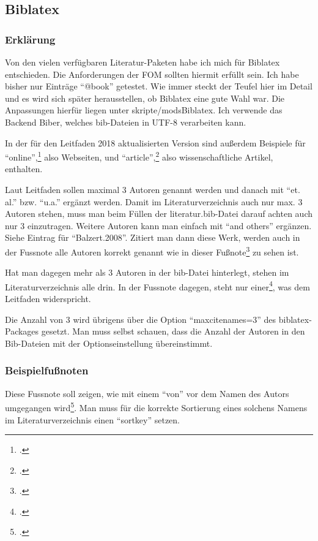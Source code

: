
\subsection{Biblatex}
\subsubsection{Erklärung}
Von den vielen verfügbaren Literatur-Paketen habe ich mich für Biblatex entschieden. Die Anforderungen der FOM sollten hiermit erfüllt sein. Ich habe bisher nur Einträge \enquote{@book} getestet. Wie immer steckt der Teufel hier im Detail und es wird sich später herausstellen, ob Biblatex eine gute Wahl war. Die Anpassungen hierfür liegen unter skripte/modsBiblatex. Ich verwende das Backend Biber, welches bib-Dateien in UTF-8 verarbeiten kann.

In der für den Leitfaden 2018 aktualisierten Version sind außerdem Beispiele für \enquote{online},\footcite[Vgl.][]{website:angular:aboutAngular} also Webseiten, und \enquote{article},\footcite[Vgl.][S. 140]{Decker2009} also wissenschaftliche Artikel, enthalten.

Laut Leitfaden sollen maximal 3 Autoren genannt werden und danach mit
\enquote{et. al.} bzw. \enquote{u.a.} ergänzt werden. Damit im Literaturverzeichnis auch nur max.
3 Autoren stehen, muss man beim Füllen der literatur.bib-Datei darauf achten auch nur 3
einzutragen. Weitere Autoren kann man einfach mit \enquote{and others} ergänzen.
Siehe Eintrag für \enquote{Balzert.2008}. Zitiert man dann diese Werk, werden auch in
der Fussnote alle Autoren korrekt genannt wie in dieser
Fußnote\footcite[Vgl.][S. 1]{Balzert.2008} zu sehen ist.

Hat man dagegen mehr als 3 Autoren in der bib-Datei hinterlegt, stehen im
Literaturverzeichnis alle drin. In der Fussnote dagegen, steht nur
einer\footcite[Vgl.][S. 1]{Balzert2.2008}, was dem Leitfaden widerspricht.

Die Anzahl von 3 wird übrigens über die Option \enquote{maxcitenames=3} des
biblatex-Packages gesetzt. Man muss selbst schauen, dass die Anzahl der Autoren
in den Bib-Dateien mit der Optionseinstellung übereinstimmt.

\subsubsection{Beispielfußnoten}
Diese Fussnote soll zeigen, wie mit einem \enquote{von} vor dem Namen des Autors
umgegangen wird\footcite[Vgl.][S. 1]{Lucke2018}. Man muss für die korrekte
Sortierung eines solchens Namens im Literaturverzeichnis einen \enquote{sortkey}
setzen.

